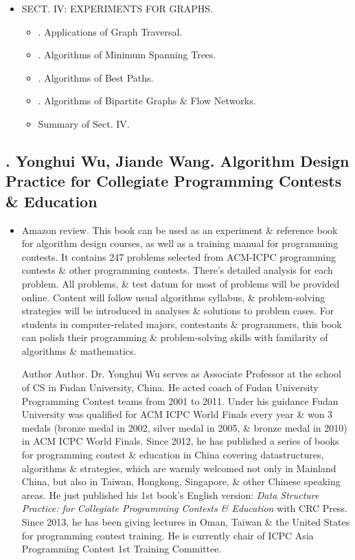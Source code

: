 \documentclass{article}
\begin{document}
\begin{itemize}
\begin{itemize}
	\end{itemize}
	\item {\sf SECT. IV: EXPERIMENTS FOR GRAPHS.}
	\begin{itemize}
		\item {. Applications of Graph Traversal.}
		\item {. Algorithms of Minimum Spanning Trees.}
		\item {. Algorithms of Best Paths.}
		\item {. Algorithms of Bipartite Graphs \& Flow Networks.}
		\item {\sf Summary of Sect. IV.}
	\end{itemize}
\end{itemize}


\subsection{\cite{Wu_Wang2018}. {\sc Yonghui Wu, Jiande Wang}. Algorithm Design Practice for Collegiate Programming Contests \& Education}

\begin{itemize}
	\item {\sf Amazon review.} This book can be used as an experiment \& reference book for algorithm design courses, as well as a training manual for programming contests. It contains 247 problems selected from ACM-ICPC programming contests \& other programming contests. There's detailed analysis for each problem. All problems, \& test datum for most of problems will be provided online. Content will follow usual algorithms syllabus, \& problem-solving strategies will be introduced in analyses \& solutions to problem cases. For students in computer-related majors, contestants \& programmers, this book can polish their programming \& problem-solving skills with familarity of algorithms \& mathematics.
	
	{\sf Author Author.} Dr. {\sc Yonghui Wu} serves as Associate Professor at the school of CS in Fudan University, China. He acted coach of Fudan University Programming Contest teams from 2001 to 2011. Under his guidance Fudan University was qualified for ACM ICPC World Finals every year \& won 3 medals (bronze medal in 2002, silver medal in 2005, \& bronze medal in 2010) in ACM ICPC World Finals. Since 2012, he has published a series of books for programming contest \& education in China covering datastructures, algorithms \& strategies, which are warmly welcomed not only in Mainland China, but also in Taiwan, Hongkong, Singapore, \& other Chinese speaking areas. He just published his 1st book's English version: {\it Data Structure Practice: for Collegiate Programming Contests \& Education} with CRC Press. Since 2013, he has been giving lectures in Oman, Taiwan \& the United States for programming contest training. He is currently chair of ICPC Asia Programming Contest 1st Training Committee.
\end{itemize}
\end{document}
